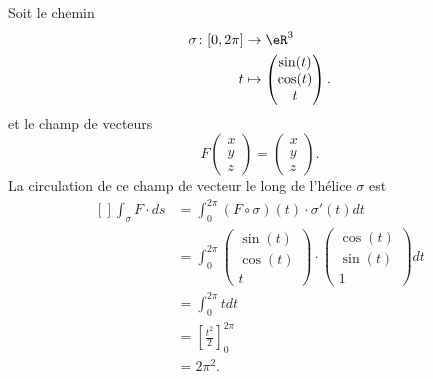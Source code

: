 \begin{example}
    Soit le chemin
    \begin{equation}
        \begin{aligned}
            \sigma\colon \mathopen[ 0 , 2\pi \mathclose]&\to \eR^3 \\
            t&\mapsto \begin{pmatrix}
                \sin(t)    \\
                \cos(t)    \\
                t
            \end{pmatrix}.
        \end{aligned}
    \end{equation}
    et le champ de vecteurs
    \begin{equation}
        F\begin{pmatrix}
            x    \\
            y    \\
            z
        \end{pmatrix}=\begin{pmatrix}
            x    \\
            y    \\
            z
        \end{pmatrix}.
    \end{equation}
    La circulation de ce champ de vecteur le long de l'hélice $\sigma$ est
    \begin{equation}
        \begin{aligned}[]
            \int_{\sigma}F\cdot ds&=\int_0^{2\pi}(F\circ \sigma)(t)\cdot \sigma'(t)dt\\
            &=\int_0^{2\pi}\begin{pmatrix}
                \sin(t)    \\
                \cos(t)    \\
                t
            \end{pmatrix}\cdot
            \begin{pmatrix}
                \cos(t)    \\
                \sin(t)    \\
                1
            \end{pmatrix}dt\\
            &=\int_0^{2\pi}tdt\\
            &=\left[ \frac{ t^2 }{2} \right]_0^{2\pi}\\
            &=2\pi^2.
        \end{aligned}
    \end{equation}

\end{example}

